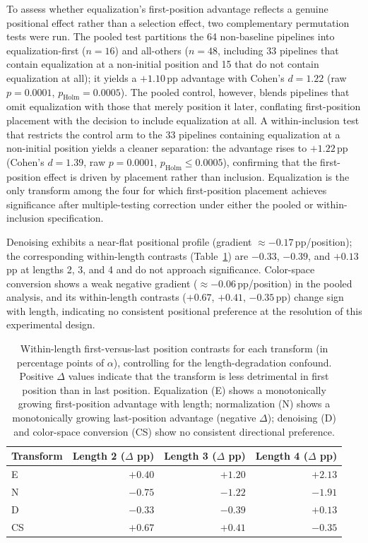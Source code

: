 \documentclass[preprint,5p,times,twocolumn]{elsarticle}
\begin{document}
To assess whether equalization's first-position advantage reflects a genuine positional effect rather than a selection effect, two complementary permutation tests were run. The pooled test partitions the 64 non-baseline pipelines into equalization-first ($n = 16$) and all-others ($n = 48$, including 33 pipelines that contain equalization at a non-initial position and 15 that do not contain equalization at all); it yields a $+1.10$\,pp advantage with Cohen's $d = 1.22$ (raw $p = 0.0001$, $p_{\text{Holm}} = 0.0005$). The pooled control, however, blends pipelines that omit equalization with those that merely position it later, conflating first-position placement with the decision to include equalization at all. A within-inclusion test that restricts the control arm to the 33 pipelines containing equalization at a non-initial position yields a cleaner separation: the advantage rises to $+1.22$\,pp (Cohen's $d = 1.39$, raw $p = 0.0001$, $p_{\text{Holm}} \leq 0.0005$), confirming that the first-position effect is driven by placement rather than inclusion. Equalization is the only transform among the four for which first-position placement achieves significance after multiple-testing correction under either the pooled or within-inclusion specification.

Denoising exhibits a near-flat positional profile (gradient $\approx -0.17$\,pp/position); the corresponding within-length contrasts (Table~\ref{tab:positional}) are $-0.33$, $-0.39$, and $+0.13$\,pp at lengths 2, 3, and 4 and do not approach significance. Color-space conversion shows a weak negative gradient ($\approx -0.06$\,pp/position) in the pooled analysis, and its within-length contrasts ($+0.67$, $+0.41$, $-0.35$\,pp) change sign with length, indicating no consistent positional preference at the resolution of this experimental design.

\begin{table}[!t]
\caption{Within-length first-versus-last position contrasts for each transform (in percentage points of $\alpha$), controlling for the length-degradation confound. Positive $\Delta$ values indicate that the transform is less detrimental in first position than in last position. Equalization (E) shows a monotonically growing first-position advantage with length; normalization (N) shows a monotonically growing last-position advantage (negative $\Delta$); denoising (D) and color-space conversion (CS) show no consistent directional preference.\label{tab:positional}}
\centering
\footnotesize
\begin{tabular}{l r r r}
\toprule
\textbf{Transform} & \textbf{Length 2 ($\Delta$ pp)} & \textbf{Length 3 ($\Delta$ pp)} & \textbf{Length 4 ($\Delta$ pp)} \\
\midrule
E   & $+0.40$ & $+1.20$ & $+2.13$ \\
N   & $-0.75$ & $-1.22$ & $-1.91$ \\
D   & $-0.33$ & $-0.39$ & $+0.13$ \\
CS  & $+0.67$ & $+0.41$ & $-0.35$ \\
\bottomrule
\end{tabular}
\end{table}
\end{document}

